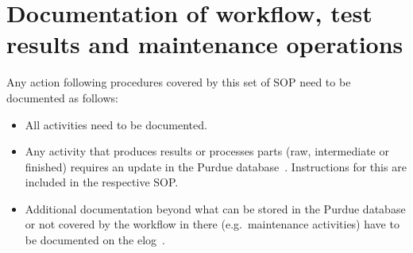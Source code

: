 \documentclass[12pt]{unlsilabsop}
\begin{document}
\section{Documentation of workflow, test results and maintenance operations}
Any action following procedures covered by this set of SOP need to be documented as follows:
\begin{itemize}
    \item All activities need to be documented.
    \item Any activity that produces results or processes parts (raw, intermediate or finished) requires an update in the Purdue database~\cite{PurdueDB}. Instructions for this are included in the respective SOP.
    \item Additional documentation beyond what can be stored in the Purdue database or not covered by the workflow in there  (e.g.~maintenance activities) have to be documented on the elog~\cite{UNLelog}.
\end{itemize}
\end{document}
